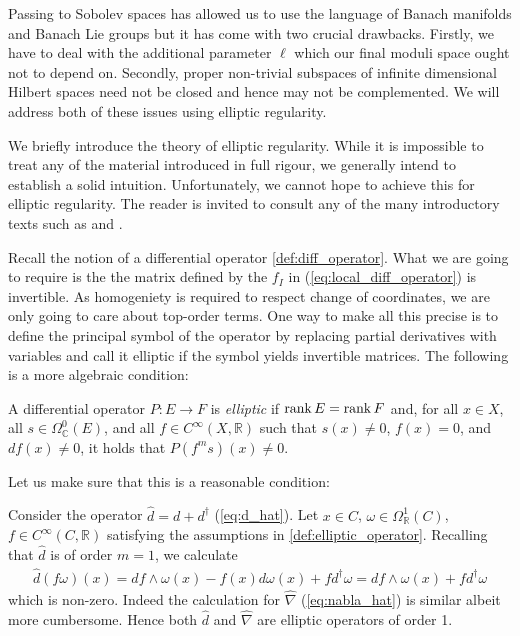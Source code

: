 \documentclass[12pt]{ociamthesis}  %
\begin{document}
Passing to Sobolev spaces has allowed us to use the language of
Banach manifolds and Banach Lie groups but it has come with two
crucial drawbacks. Firstly, we have to deal with the additional
parameter $\ell$ which our final moduli space ought not to depend on.
Secondly, proper non-trivial subspaces of infinite dimensional Hilbert
spaces need not be closed and hence may not be complemented.
We will address both of these issues using elliptic regularity.

We briefly introduce the theory of elliptic regularity. While it is
impossible to treat any of the material introduced in full rigour,
we generally intend to establish a solid intuition. Unfortunately, we
cannot hope to achieve this for elliptic regularity. The reader is
invited to consult any of the many introductory texts such
as \cite{hance2014} and \cite[Chapter 6]{warner1983}.

Recall the notion of a differential operator \ref{def:diff_operator}.
What we are going to require is the the matrix defined by the
$f_I$ in (\ref{eq:local_diff_operator}) is invertible.
As homogeniety is required to respect change of coordinates,
we are only going to care about top-order terms. One way to make all
this precise is to define the principal symbol of the operator by
replacing partial derivatives with variables and
call it elliptic if the symbol yields invertible matrices.
The following is a more algebraic condition:

\begin{definition}\label{def:elliptic_operator}
  A differential operator $P:E\to F$ is \emph{elliptic} if
  $\operatorname{rank} E = \operatorname{rank} F$ and, for all $x\in X$, all $s\in\Omega^0_{\mathbb C}(E)$,
  and all $f\in C^\infty(X,\mathbb R)$ such that $s(x) \neq 0$,
  $f(x) = 0$, and $df(x) \neq 0$, it holds that $P(f^m s)(x) \neq 0$.
\end{definition}

Let us make sure that this is a reasonable condition:

\begin{example}
  Consider the operator $\hat d = d + d^\dagger$ (\ref{eq:d_hat}). Let
  $x\in C$, $\omega\in\Omega^1_{\mathbb R}(C)$,
  $f\in C^\infty(C,\mathbb R)$
  satisfying the assumptions in \ref{def:elliptic_operator}.
  Recalling that $\hat d$ is of order $m=1$, we calculate
  \begin{align*}
    \hat d(f\omega)(x)= df\wedge \omega(x) - f(x)d\omega(x) + fd^\dagger\omega= df\wedge\omega(x) + fd^\dagger\omega
  \end{align*}
  which is non-zero.  Indeed the calculation for
  $\hat\nabla$ (\ref{eq:nabla_hat}) is similar albeit more cumbersome.
  Hence both $\hat d$ and $\hat\nabla$ are elliptic operators of order 1.
\end{example}
\end{document}
